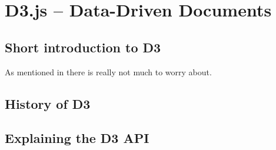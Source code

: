 \chapter{D3.js – Data-Driven Documents}
\label{cha:d3js}

\section{Short introduction to D3}

As mentioned in \cite{Drake1948} there is really not much to worry about.

\section{History of D3}

\section{Explaining the D3 API}
